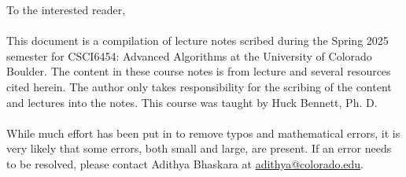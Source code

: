 To the interested reader,
\\
\\
This document is a compilation of lecture notes scribed during the Spring 2025 semester for CSCI6454: Advanced Algorithms at the University of Colorado Boulder. The content in these course notes is from lecture and several resources cited herein. The author only takes responsibility for the scribing of the content and lectures into the notes. This course was taught by Huck Bennett, Ph. D.
\\
\\
While much effort has been put in to remove typos and mathematical errors, it is very likely that some errors, both small and large, are present. If an error needs to be resolved, please contact Adithya Bhaskara at \href{mailto:adithya@colorado.edu}{adithya@colorado.edu}.
\\
\\
\vfill
{}